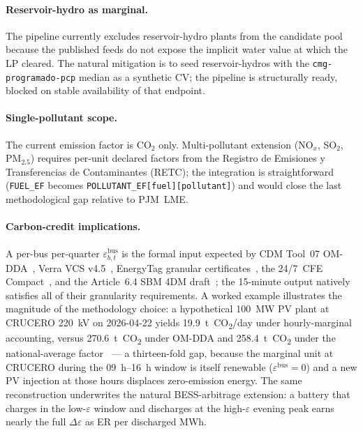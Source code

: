 \paragraph{Reservoir-hydro as marginal.}
The pipeline currently excludes reservoir-hydro plants from the
candidate pool because the published feeds do not expose the
implicit water value at which the LP cleared.  The natural mitigation
is to seed reservoir-hydros with the
\texttt{cmg-programado-pcp} median as a synthetic CV; the pipeline
is structurally ready, blocked on stable availability of that
endpoint.

\paragraph{Single-pollutant scope.}
The current emission factor is CO$_2$ only.  Multi-pollutant
extension (NO$_x$, SO$_2$, PM$_{2.5}$) requires per-unit declared
factors from the Registro de Emisiones y Transferencias de
Contaminantes (RETC); the integration is straightforward
(\texttt{FUEL\_EF} becomes \texttt{POLLUTANT\_EF[fuel][pollutant]})
and would close the last methodological gap relative to PJM~LME.

\paragraph{Carbon-credit implications.}
A per-bus per-quarter $\varepsilon^{\mathrm{bus}}_{b,t}$ is the
formal input expected by CDM Tool~07 OM-DDA~\cite{UNFCCCTool07},
Verra VCS v4.5~\cite{VerraVCS45}, EnergyTag granular
certificates~\cite{EnergyTagGC}, the 24/7~CFE
Compact~\cite{CFE247}, and the Article~6.4 SBM 4DM
draft~\cite{Article64Draft}; the 15-minute output natively
satisfies all of their granularity requirements.  A worked example
illustrates the magnitude of the methodology choice: a hypothetical
\SI{100}{\MW} PV plant at CRUCERO 220~kV on 2026-04-22 yields
\SI{19.9}{\tonne CO_2}/day under hourly-marginal accounting,
versus \SI{270.6}{\tonne CO_2} under OM-DDA and \SI{258.4}{\tonne CO_2}
under the national-average factor~\cite{InvNac2024} — a thirteen-fold
gap, because the marginal unit at CRUCERO during the
\SIrange{09}{16}{\hour} window is itself renewable
($\varepsilon^{\mathrm{bus}}=0$) and a new PV injection at those
hours displaces zero-emission energy.  The same reconstruction
underwrites the natural BESS-arbitrage extension: a battery that
charges in the low-$\varepsilon$ window and discharges at the
high-$\varepsilon$ evening peak earns nearly the full
$\Delta\varepsilon$ as ER per discharged MWh.
